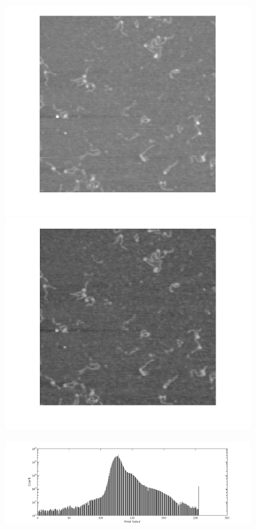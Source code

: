 \documentclass{article}
\begin{document}
\begin{figure}[htb!]
	\centering
	\begin{subfigure}{0.28\textwidth}
		\includegraphics[width=\linewidth]{beforeDenoise_img.png}			
		
		\vspace{0.1cm}
		
		\includegraphics[width=\linewidth]{afterDenoise_img.png}
		\caption{}
		\label{fig:denoising_imgs}
	\end{subfigure}
	\begin{subfigure}{0.7\textwidth}
		\includegraphics[width=\linewidth]{beforeDenoise_histogram.png}
		

\end{subfigure}
\end{figure}
\end{document}
